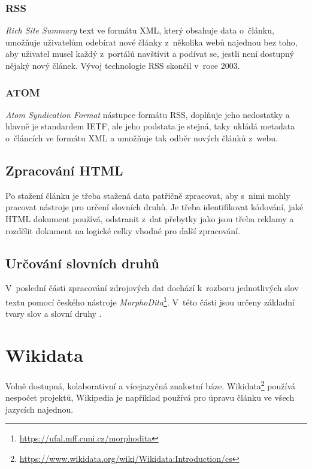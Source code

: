 \subsubsection*{RSS} 
\textit{Rich Site Summary} text ve formátu XML, který obsahuje data o~článku, umožňuje uživatelům odebírat nové články z~několika webů najednou bez toho, aby uživatel musel každý z~portálů navštívit a podívat se, jestli není dostupný nějaký nový článek. Vývoj technologie RSS skončil v~roce 2003\cite{krcmar_2006}\cite{Glotzbach2007RSSAA}.

\subsubsection*{ATOM}  
\textit{Atom Syndication Format} nástupce formátu RSS, doplňuje jeho nedostatky a hlavně je standardem IETF, ale jeho podstata je stejná, taky ukládá metadata o~článcích ve formátu XML a umožňuje tak odběr nových článků z~webu\cite{cimprich_2006}\cite{sayre2005atom}.

\subsection*{Zpracování HTML}
Po stažení článku je třeba stažená data patřičně zpracovat, aby s~nimi mohly pracovat nástroje pro určení slovních druhů. Je třeba identifikovat kódování, jaké HTML dokument používá, odstranit z~dat přebytky jako jsou třeba reklamy a rozdělit dokument na logické celky vhodné pro další zpracování\cite{FITBT20846}.

\subsection*{Určování slovních druhů}
V~poslední části zpracování zdrojových dat dochází k~rozboru jednotlivých slov textu pomocí českého nástroje \textit{MorphoDita}\footnote{\url{https://ufal.mff.cuni.cz/morphodita}}. V~této části jsou určeny základní tvary slov a slovní druhy \cite{FITBT20846}.

\section{Wikidata}
\label{teorie:wikidata}
Volně dostupná, kolaborativní a vícejazyčná znalostní báze. Wikidata\footnote{\url{https://www.wikidata.org/wiki/Wikidata:Introduction/cs}} používá nespočet projektů, Wikipedia je například používá pro úpravu článku ve všech jazycích najednou\cite{vrandevcic2014wikidata}.


